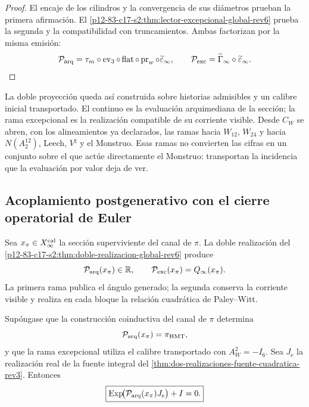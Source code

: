 \begin{proof}
El encaje de los cilindros y la convergencia de sus diámetros prueban la
primera afirmación. El
\cref{p12-83-c17-s2:thm:lector-excepcional-global-rev6} prueba la segunda y la
compatibilidad con truncamientos. Ambas factorizan por la misma emisión:
\[
\mathcal P_{\rm arq}
=\tau_m\circ\operatorname{ev}_3\circ\operatorname{flat}
 \circ\operatorname{pr}_w
 \circ\widetilde\varepsilon_\infty,
\qquad
\mathcal P_{\rm exc}
=\widetilde\Gamma_\infty\circ\widetilde\varepsilon_\infty.
\]
\end{proof}

La doble proyección queda así construida sobre historias admisibles y un
calibre inicial transportado. El continuo es la evaluación arquimediana de
la sección; la rama excepcional es la realización compatible de su corriente
visible. Desde \(C_W\) se abren, con los alineamientos ya declarados, las
ramas hacia \(W_{12}\), \(W_{24}\) y hacia
\(N(A_2^{12})\), Leech, \(V^\natural\) y el Monstruo. Esas ramas no convierten
las cifras en un conjunto sobre el que actúe directamente el Monstruo:
transportan la incidencia que la evaluación por valor deja de ver.

\subsection{Acoplamiento postgenerativo con el cierre operatorial de Euler}
\label{p12-83-c17-s2:sec:acoplamiento-euler-doble-proyeccion-rev3}

Sea \(x_\pi\in X_\infty^{\rm cal}\) la sección superviviente del canal de
\(\pi\). La doble realización del
\cref{p12-83-c17-s2:thm:doble-realizacion-global-rev6} produce
\[
 \mathcal P_{\rm arq}(x_\pi)\in\mathbb R,
 \qquad
 \mathcal P_{\rm exc}(x_\pi)=Q_\infty(x_\pi).
\]
La primera rama publica el ángulo generado; la segunda conserva la corriente
visible y realiza en cada bloque la relación cuadrática de Paley--Witt.

\begin{theorem}
\label{p12-83-c17-s2:thm:acoplamiento-euler-doble-proyeccion-rev3}
Supóngase que la construcción coinductiva del canal de \(\pi\) determina
\[
 \mathcal P_{\rm arq}(x_\pi)=\pi_{\rm HMT},
\]
y que la rama excepcional utiliza el calibre transportado con
\(A_W^2=-I_6\). Sea \(J_{\mathrm e}\) la realización real de la fuente
integral del \cref{thm:dos-realizaciones-fuente-cuadratica-rev3}. Entonces
\begin{equation}
 \boxed{
 \operatorname{Exp}\!\bigl(
   \mathcal P_{\rm arq}(x_\pi)J_{\mathrm e}
 \bigr)+I=0.}
 \label{p12-83-c17-s2:eq:acoplamiento-euler-doble-proyeccion-rev3}
\end{equation}
\end{theorem}

